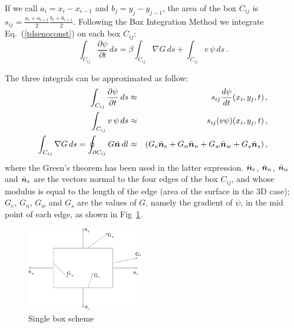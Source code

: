 \documentclass[a4paper,11pt]{article}
\newcommand{\ve}[1]{\mbox{\boldmath $ #1$}}
\begin{document}
If we call $a_i = x_i - x_{i-1}$ and
$b_j = y_j - y_{j-1}$, the area of the box $C_{ij}$ is
$s_{ij} = \frac{a_i+a_{i+1}}{2} \frac{b_i+b_{i+1}}{2}$.
Following the Box Integration Method we integrate Eq.~(\ref{tdsenoconst}) on each box $C_{ij}$:
\begin{equation}
\int_{C_{ij}} \frac{\partial \psi}{\partial t} \, ds = 
   \beta \int_{C_{ij}} \nabla G \, ds + 
   \int_{C_{ij}} v \, \psi \, ds \, .
\end{equation}

The three integrals can be approximated as follow:
\begin{eqnarray}
\int_{C_{ij}} \frac{\partial \psi}{\partial t} \, ds & \approx &
   s_{ij} \frac{d \psi}{dt}(x_i, y_j, t) \, , \\
\int_{C_{ij}} v \, \psi \, ds & \approx & s_{ij} (v \psi)(x_i, y_j, t) \, , \\
\int_{C_{ij}} \nabla G \, ds = \oint_{\partial C_{ij}} G \bar{\ve{n}} \, dl & \approx &
   (G_e \bar{\ve n}_e + G_n \bar{\ve n}_n + G_w \bar{\ve n}_w + G_s \bar{\ve n}_s) \, ,
   \label{green_int}
\end{eqnarray}
where the Green's theorem has been used in the latter expression.
$\bar{\ve n}_e$, $\bar{\ve n}_n$, $\bar{\ve n}_w$ and $\bar{\ve n}_s$ are the vectors normal to the four
edges of the box ${C_{ij}}$, and whose modulus is equal to the length of the edge (area of the surface in the 3D case);
$G_e$, $G_n$, $G_w$ and $G_s$ are the values of $G$, namely the gradient of $\psi$, in the mid point of each edge, as shown in Fig~\ref{fig:single_box}.

\begin{figure}
\centerline{\includegraphics[width=2in] {box} }
\caption{Single box scheme}
\label{fig:single_box}
\end{figure}
\end{document}
